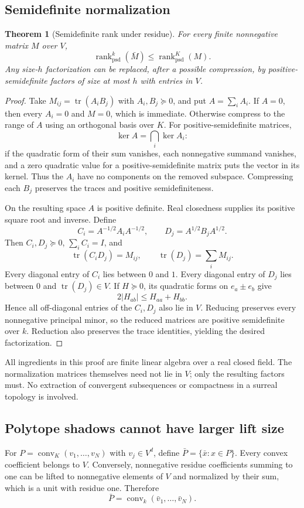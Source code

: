 \documentclass[11pt,a4paper]{article}
\numberwithin{equation}{section}
\newtheorem{theorem}{Theorem}[section]
\theoremstyle{plain}
\newcommand{\conv}{\operatorname{conv}}
\newcommand{\rankpsd}{\operatorname{rank}_{\mathrm{psd}}}
\newcommand{\tr}{\operatorname{tr}}%
\begin{document}
\subsection{Semidefinite normalization}
\begin{theorem}[Semidefinite rank under residue]\label{poly:ic:thm:residuepsd}
For every finite nonnegative matrix $M$ over $V$,
\[
 \rankpsd^{k}(\bar M)\leq\rankpsd^{K}(M).
\]
Any size-$h$ factorization can be replaced, after a possible compression,
by positive-semidefinite factors of size at most $h$ with entries in $V$.
\end{theorem}
\begin{proof}
Take $M_{ij}=\tr(A_iB_j)$ with $A_i,B_j\succeq0$, and put
$A=\sum_iA_i$. If $A=0$, then every $A_i=0$ and $M=0$, which is
immediate. Otherwise compress to the range of $A$ using an orthogonal
basis over $K$. For positive-semidefinite matrices,
\[
 \ker A=\bigcap_i\ker A_i:
\]
if the quadratic form of their sum vanishes, each nonnegative summand
vanishes, and a zero quadratic value for a positive-semidefinite matrix
puts the vector in its kernel. Thus the $A_i$ have no components on
the removed subspace. Compressing each $B_j$ preserves the traces and
positive semidefiniteness.

On the resulting space $A$ is positive definite. Real closedness supplies
its positive square root and inverse. Define
\[
 C_i=A^{-1/2}A_iA^{-1/2},\qquad
 D_j=A^{1/2}B_jA^{1/2}.
\]
Then $C_i,D_j\succeq0$, $\sum_iC_i=I$, and
\[
 \tr(C_iD_j)=M_{ij},\qquad
 \tr(D_j)=\sum_iM_{ij}.
\]
Every diagonal entry of $C_i$ lies between $0$ and $1$. Every diagonal
entry of $D_j$ lies between $0$ and $\tr(D_j)\in V$. If $H\succeq0$,
its quadratic forms on $e_a\pm e_b$ give
\[
 2|H_{ab}|\leq H_{aa}+H_{bb}.
\]
Hence all off-diagonal entries of the $C_i,D_j$ also lie in $V$.
Reducing preserves every nonnegative principal minor, so the reduced
matrices are positive semidefinite over $k$. Reduction also preserves
the trace identities, yielding the desired factorization.
\end{proof}

All ingredients in this proof are finite linear algebra over a real
closed field. The normalization matrices themselves need not lie in
$V$; only the resulting factors must. No extraction of convergent
subsequences or compactness in a surreal topology is involved.

\subsection{Polytope shadows cannot have larger lift size}
For $P=\conv_K(v_1,\ldots,v_N)$ with $v_j\in V^d$, define
$\bar P=\{\bar x:x\in P\}$. Every convex coefficient belongs to $V$.
Conversely, nonnegative residue coefficients summing to one can be
lifted to nonnegative elements of $V$ and normalized by their sum,
which is a unit with residue one. Therefore
\begin{equation}\label{poly:ic:eq:generalshadow}
 \bar P=\conv_k(\bar v_1,\ldots,\bar v_N).
\end{equation}
\end{document}
